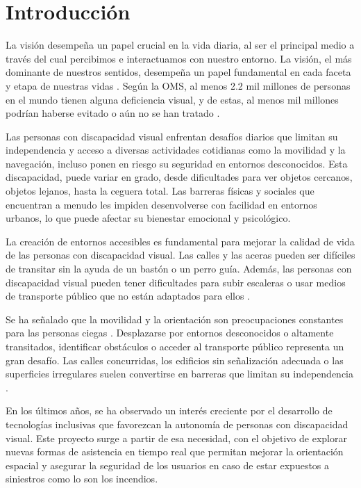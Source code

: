 \chapter{Introducción}
La visión desempeña un papel crucial en la vida diaria, al ser el principal medio a través del cual percibimos e interactuamos con nuestro entorno. La visión, el más dominante de nuestros sentidos, desempeña un papel fundamental en cada faceta y etapa de nuestras vidas \cite{OMS_ceguera}. Según la OMS, al menos 2.2 mil millones de personas en el mundo tienen alguna deficiencia visual, y de estas, al menos mil millones podrían haberse evitado o aún no se han tratado \cite{OMS_ceguera}.

Las personas con discapacidad visual enfrentan desafíos diarios que limitan su independencia y acceso a diversas actividades cotidianas como la movilidad y la navegación, incluso ponen en riesgo su seguridad en entornos desconocidos. Esta discapacidad, puede variar en grado, desde dificultades para ver objetos cercanos, objetos lejanos, hasta la ceguera total. Las barreras físicas y sociales que encuentran a menudo les impiden desenvolverse con facilidad en entornos urbanos, lo que puede afectar su bienestar emocional y psicológico.

La creación de entornos accesibles es fundamental para mejorar la calidad de vida de las personas con discapacidad visual.  Las calles y las aceras pueden ser difíciles de transitar sin la ayuda de un bastón o un perro guía. Además, las personas con discapacidad visual pueden tener dificultades para subir escaleras o usar medios de transporte público que no están adaptados para ellos \cite{Covarrubias2025_desafios}.

Se ha señalado que la movilidad y la orientación son preocupaciones constantes para las personas ciegas \cite{PoonaSchool_mob}. Desplazarse por entornos desconocidos o altamente transitados, identificar obstáculos o acceder al transporte público representa un gran desafío. Las calles concurridas, los edificios sin señalización adecuada o las superficies irregulares suelen convertirse en barreras que limitan su independencia \cite{PoonaSchool_mob}.

En los últimos años, se ha observado un interés creciente por el desarrollo de tecnologías inclusivas que favorezcan la autonomía de personas con discapacidad visual. Este proyecto surge a partir de esa necesidad, con el objetivo de explorar nuevas formas de asistencia en tiempo real que permitan mejorar la orientación espacial y asegurar la seguridad de los usuarios en caso de estar expuestos a siniestros como lo son los incendios.

